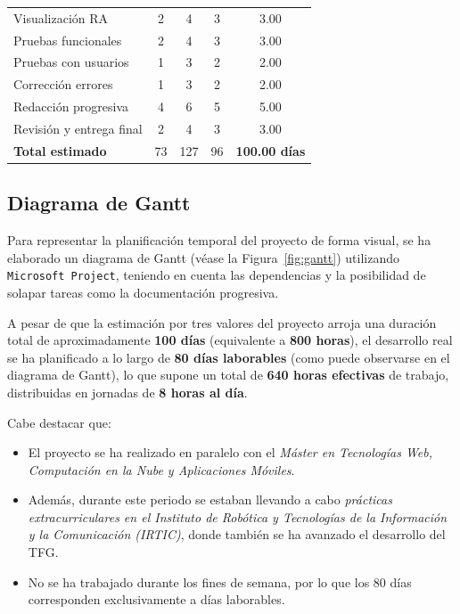 \begin{table}[H]
\begin{tabular}{|l|c|c|c|c|}
Visualización RA & 2 & 4 & 3 & 3.00 \\
Pruebas funcionales & 2 & 4 & 3 & 3.00 \\
Pruebas con usuarios & 1 & 3 & 2 & 2.00 \\
Corrección errores & 1 & 3 & 2 & 2.00 \\
Redacción progresiva & 4 & 6 & 5 & 5.00 \\
Revisión y entrega final & 2 & 4 & 3 & 3.00 \\
\hline
\textbf{Total estimado} & 73 & 127 & 96 & \textbf{100.00 días} \\
\hline
\end{tabular}
\end{table}

\subsection{Diagrama de Gantt}

Para representar la planificación temporal del proyecto de forma visual, se ha elaborado un diagrama de Gantt  (véase la Figura~\ref{fig:gantt}) utilizando \texttt{Microsoft Project}, teniendo en cuenta las dependencias y la posibilidad de solapar tareas como la documentación progresiva.

A pesar de que la estimación por tres valores del proyecto arroja una duración total de aproximadamente \textbf{100 días} (equivalente a \textbf{800 horas}), el desarrollo real se ha planificado a lo largo de \textbf{80 días laborables} (como puede observarse en el diagrama de Gantt), lo que supone un total de \textbf{640 horas efectivas} de trabajo, distribuidas en jornadas de \textbf{8 horas al día}.

Cabe destacar que:
\begin{itemize}
    \item El proyecto se ha realizado en paralelo con el \textit{Máster en Tecnologías Web, Computación en la Nube y Aplicaciones Móviles}.
    \item Además, durante este periodo se estaban llevando a cabo \textit{prácticas extracurriculares en el Instituto de Robótica y Tecnologías de la Información y la Comunicación (IRTIC)}, donde también se ha avanzado el desarrollo del TFG.
    \item No se ha trabajado durante los fines de semana, por lo que los 80 días corresponden exclusivamente a días laborables.
\end{itemize}


